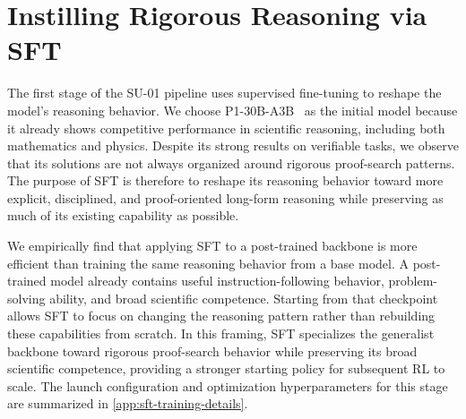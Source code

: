 \section{Instilling Rigorous Reasoning via SFT}
\label{sec:sft}

The first stage of the SU-01 pipeline uses supervised fine-tuning to
reshape the model's reasoning behavior. We choose P1-30B-A3B~\citep{chen2025p1} as the initial model
because it already shows competitive performance in scientific reasoning,
including both mathematics and physics. Despite its strong results on
verifiable tasks, we observe that its solutions are not always organized around
rigorous proof-search patterns. The purpose of SFT is therefore to reshape its
reasoning behavior toward more explicit, disciplined, and proof-oriented
long-form reasoning while preserving as much of its existing capability as
possible.

We empirically find that applying SFT to a post-trained backbone is more
efficient than training the same reasoning behavior from a base model. A
post-trained model already contains useful instruction-following behavior,
problem-solving ability, and broad scientific competence. Starting from
that checkpoint allows SFT to focus on changing the reasoning pattern rather
than rebuilding these capabilities from scratch. 
In this framing, SFT specializes the generalist backbone toward rigorous proof-search behavior while preserving its broad scientific competence, providing a stronger
  starting policy for subsequent RL to scale. 
The launch configuration and optimization
hyperparameters for this stage are summarized in
\cref{app:sft-training-details}. 





